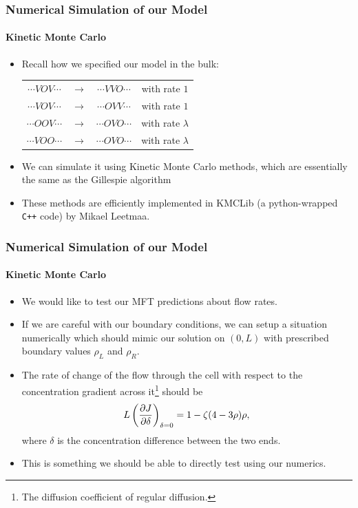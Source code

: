 \documentclass{beamer}
\begin{document}
\begin{frame}
 \frametitle{Numerical Simulation of our Model}
 \framesubtitle{Kinetic Monte Carlo}
 \begin{itemize}
  \item Recall how we specified our model in the bulk:
  \\
  \begin{center}
    \begin{tabular}{c c c c}
  $\cdots VOV\cdots$ & $\longrightarrow$ & $\cdots VVO \cdots$ & with rate $1$ \\
  $\cdots VOV\cdots$ & $\longrightarrow$ & $\cdots OVV \cdots$ & with rate $1$ \\
  $\cdots OOV\cdots$ & $\longrightarrow$ & $\cdots OVO \cdots$ & with rate $\lambda$ \\
  $\cdots VOO\cdots$ & $\longrightarrow$ & $\cdots OVO \cdots$ & with rate $\lambda$ \\
 \end{tabular}
  \end{center}
  \item We can simulate it using Kinetic Monte Carlo methods, which are essentially the same as the Gillespie algorithm
  \item These methods are efficiently implemented in KMCLib (a python-wrapped \texttt{C++} code) by Mikael Leetmaa.
 \end{itemize}
\end{frame}

\begin{frame}
 \frametitle{Numerical Simulation of our Model}
 \framesubtitle{Kinetic Monte Carlo}
 \begin{itemize}
  \item We would like to test our MFT predictions about flow rates.
  \item If we are careful with our boundary conditions, we can setup a situation numerically which should mimic our solution on $(0, L)$ with prescribed boundary values $\rho_L$ and $\rho_R$.
  \item The rate of change of the flow through the cell with respect to the concentration gradient across it\footnote{The diffusion coefficient of regular diffusion.} should be
  \begin{equation*}
   L \left( \frac{\partial J}{\partial \delta} \right)_{\delta = 0} = 1 - \zeta (4-3\rho)\rho,
  \end{equation*}
  where $\delta$ is the concentration difference between the two ends.
 \item This is something we should be able to directly test using our numerics.
 \end{itemize}
\end{frame}
\end{document}
